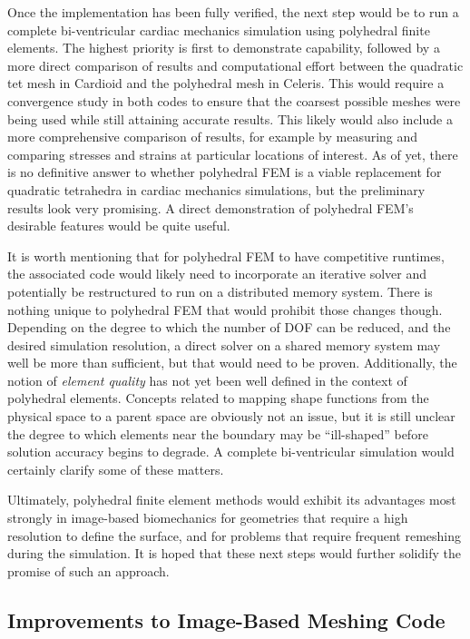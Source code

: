 Once the implementation has been fully verified, the next step would be to run a complete bi-ventricular cardiac mechanics simulation using polyhedral finite elements. The highest priority is first to demonstrate capability, followed by a more direct comparison of results and computational effort between the quadratic tet mesh in Cardioid and the polyhedral mesh in Celeris. This would require a convergence study in both codes to ensure that the coarsest possible meshes were being used while still attaining accurate results. This likely would also include a more comprehensive comparison of results, for example by measuring and comparing stresses and strains at particular locations of interest. As of yet, there is no definitive answer to whether polyhedral FEM is a viable replacement for quadratic tetrahedra in cardiac mechanics simulations, but the preliminary results look very promising. A direct demonstration of polyhedral FEM's desirable features would be quite useful.

It is worth mentioning that for polyhedral FEM to have competitive runtimes, the associated code would likely need to incorporate an iterative solver and potentially be restructured to run on a distributed memory system. There is nothing unique to polyhedral FEM that would prohibit those changes though. Depending on the degree to which the number of DOF can be reduced, and the desired simulation resolution, a direct solver on a shared memory system may well be more than sufficient, but that would need to be proven. Additionally, the notion of \textit{element quality} has not yet been well defined in the context of polyhedral elements. Concepts related to mapping shape functions from the physical space to a parent space are obviously not an issue, but it is still unclear the degree to which elements near the boundary may be ``ill-shaped'' before solution accuracy begins to degrade. A complete bi-ventricular simulation would certainly clarify some of these matters.

Ultimately, polyhedral finite element methods would exhibit its advantages most strongly in image-based biomechanics for geometries that require a high resolution to define the surface, and for problems that require frequent remeshing during the simulation. It is hoped that these next steps would further solidify the promise of such an approach.

\subsection{Improvements to Image-Based Meshing Code}
\label{Improvements to Image-Based Meshing Code}

